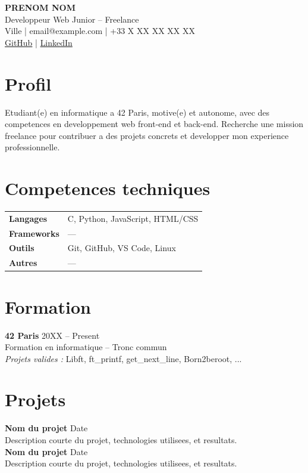 \documentclass[a4paper,11pt]{article}
\begin{document}
\begin{center}
    {\LARGE\bfseries PRENOM NOM}\\[4pt]
    {\color{accent} Developpeur Web Junior -- Freelance}\\[4pt]
    Ville | email@example.com | +33 X XX XX XX XX\\
    \href{https://github.com/username}{GitHub} | \href{https://linkedin.com/in/username}{LinkedIn}
\end{center}

\section{Profil}
Etudiant(e) en informatique a 42 Paris, motive(e) et autonome, avec des competences en developpement web front-end et back-end. Recherche une mission freelance pour contribuer a des projets concrets et developper mon experience professionnelle.

\section{Competences techniques}
\begin{tabularx}{\textwidth}{@{}lX@{}}
    \textbf{Langages} & C, Python, JavaScript, HTML/CSS \\
    \textbf{Frameworks} & --- \\
    \textbf{Outils} & Git, GitHub, VS Code, Linux \\
    \textbf{Autres} & --- \\
\end{tabularx}

\section{Formation}
\textbf{42 Paris} \hfill 20XX -- Present\\
Formation en informatique -- Tronc commun\\[4pt]
\textit{Projets valides :} Libft, ft\_printf, get\_next\_line, Born2beroot, ...

\section{Projets}
\textbf{Nom du projet} \hfill Date\\
Description courte du projet, technologies utilisees, et resultats.\\[4pt]
\textbf{Nom du projet} \hfill Date\\
Description courte du projet, technologies utilisees, et resultats.
\end{document}
